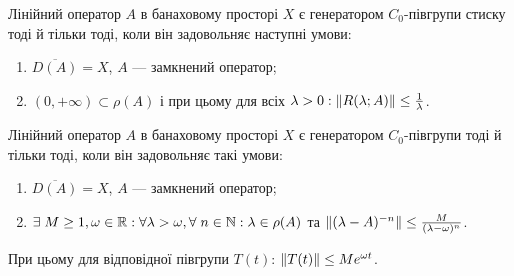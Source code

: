 \begin{theory}
    \begin{theorem*}
        Лінійний оператор $A$ в банаховому просторі $X$ є 
    генератором $C_0$-півгрупи стиску тоді й тільки тоді, коли він задовольняє 
    наступні умови:
    \begin{enumerate}
        \item $\overline{D(A)} = X$, $A$ --- замкнений оператор;
        \item $(0, +\infty) \subset \rho(A)$ і при цьому для всіх $\lambda > 0 : \left\lVert R(\lambda; A)\right\rVert \leq \frac{1}{\lambda}$.
    \end{enumerate}
    \end{theorem*}
    \begin{theorem*}
        Лінійний оператор $A$ в банаховому 
    просторі $X$ є генератором $C_0$-півгрупи тоді й тільки тоді, коли він задовольняє 
    такі умови:
    \begin{enumerate}
        \item $\overline{D(A)} = X$, $A$ --- замкнений оператор;
        \item $\exists \; M \geq 1, \omega \in \mathbb{R} : \forall \lambda > \omega, \forall \; n \in \mathbb{N} : \lambda \in \rho(A)$ та
        $\left\lVert(\lambda - A)^{-n}\right\rVert \leq \frac{M}{(\lambda - \omega)^n}$.
    \end{enumerate}
    При цьому для відповідної півгрупи $T(t)$: $\left\lVert T(t)\right\rVert \leq M e^{\omega t}$.
    \end{theorem*}
\end{theory}